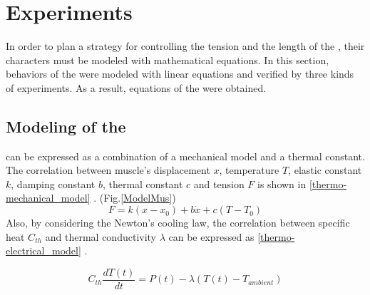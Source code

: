 \section{Experiments}\label{section_modeling}
In order to plan a strategy for controlling the tension and the length of the \scps, their characters must be modeled with mathematical equations. In this section, behaviors of the \scps were modeled with linear equations and verified by three kinds of experiments. As a result, equations of the \antas were obtained.

\subsection{Modeling of the \ANTAs}\label{section_thermo_model}
\scp can be expressed as a combination of a mechanical model and a thermal constant. The correlation between muscle's displacement $x$, temperature $T$, elastic constant $k$, damping constant $b$, thermal constant $c$ and tension $F$ is shown in \eqref{thermo-mechanical_model} \cite{yip}.
(Fig.\ref{ModelMus})
\begin{equation} \label{thermo-mechanical_model}
F=k(x-x_0) + b\dot{x}+c(T-T_0)
\end{equation}
Also, by considering the Newton's cooling law, the correlation between specific heat $C_{th}$ and thermal conductivity $\lambda$ can be expressed as \eqref{thermo-electrical_model} \cite{yip}.

\begin{equation} \label{thermo-electrical_model}
C_{th}\frac{dT(t)}{dt} = P(t) - \lambda(T(t)-T_{ambient})
\end{equation}

